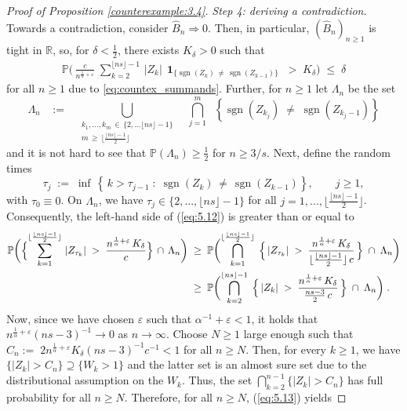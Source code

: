 \documentclass[11pt]{article}
\theoremstyle{definition}\newtheorem{example}[theorem]{Example}
\theoremstyle{definition}\newtheorem{counterexample}[theorem]{Counterexample}
\theoremstyle{definition}\newtheorem{remark}[theorem]{Remark}
\theoremstyle{definition}\newtheorem{defi}[theorem]{Definition}
\numberwithin{equation}{section}
\newcommand{\R}{\mathbb{R}}
\newcommand{\Pro}{\mathbb{P}}										%
\newcommand{\ind}{\operatorname{\mathbf{1}}}							%
\newcommand{\union}[2]{\overset{#2}{\bigcup\limits_{#1}}\;}					%
\newcommand{\intersection}[2]{\overset{#2}{\bigcap\limits_{#1}}\;}				%
\renewcommand{\|}{\; : \, \;}											%
\begin{document}
\begin{proof}[Proof of Proposition \ref{counterexample:3.4}]
	\phantom{ee} \emph{Step 4: deriving a contradiction}.
	Towards a contradiction, consider $\hat{B}_n \Rightarrow 0$. Then, in particular, $(\hat{B}_n)_{n\ge 1}$ is tight in $\R$, so, for $\delta< \frac{1}{2}$, there exists $K_\delta>0$ such that 
	\begin{align} \Pro \biggl( \, \frac{c}{n^{\frac 1 \alpha+\varepsilon}}\;  \sum_{k=2}^{\lfloor n s\rfloor  -1} \, |Z_k| \, \ind_{\{\operatorname{sgn}(Z_k)\, \neq \, \operatorname{sgn}(Z_{k-1})\}} \; > \; K_\delta \biggr) \; \le \; \delta \label{eq:5.12}
	\end{align}
	for all $n\ge 1$ due to \eqref{eq:countex_summands}. Further, for $n\ge 1$ let $\Lambda_n$ be the set
	$$ \Lambda_n \; \; \; := \;\; \; \union{\substack{k_1,...,k_{m} \, \in \, \{2,...\lfloor n s\rfloor -1\}\\ m \, \ge \, \lfloor \frac{\lfloor n s\rfloor-1}{2}\rfloor }}{} \; \; \intersection{j=1}{m} \; \left\{ \operatorname{sgn}(Z_{k_j}) \; \neq \; \operatorname{sgn}(Z_{k_j-1}) \right\}$$
	and it is not hard to see that $\Pro(\Lambda_n)\ge \frac12$ for $n\ge 3/s$. Next, define the random times 
	$$\tau_j \; := \; \operatorname{inf}\, \left\{ \, k>\tau_{j-1} \; : \; \operatorname{sgn}(Z_{k}) \, \neq \, \operatorname{sgn}(Z_{k-1})\right\}, \qquad j\ge 1,$$
	with $\tau_0 \equiv 0$. On $\Lambda_n$, we have $\tau_j \in \{ 2,...,\lfloor n s\rfloor-1\}$ for all $j=1,..., \lfloor \frac{\lfloor n s\rfloor-1}{2} \rfloor$. Consequently, the left-hand side of (\ref{eq:5.12}) is greater than or equal to
	\begin{align}
	\Pro \biggl(  \Bigl\{ \sum_{k=1}^{\lfloor \frac{\lfloor n s\rfloor-1}{2} \rfloor } \, |Z_{\tau_k}|  \; > \; \frac{n^{\frac 1 \alpha+\varepsilon}\, K_\delta}{c}   \Bigr\}  \, \cap \,  \Lambda_n \biggr) \; &\ge \; \Pro  \biggl(   \intersection{k=1}{\lfloor \frac{\lfloor n s\rfloor-1}{2} \rfloor} \, \Bigl\{ \, |Z_{\tau_k}|  \; > \; \frac{n^{\frac 1 \alpha+\varepsilon}\, K_\delta}{\lfloor \frac{\lfloor n s\rfloor-1}{2} \rfloor \, c}  \, \Bigr\} \; \cap \; \Lambda_n  \biggr) \notag \\
		&\ge \; \Pro \biggl(  \intersection{k=2}{\lfloor n s\rfloor-1} \, \Bigl\{ \, |Z_{k}|  \; > \; \frac{n^{\frac 1 \alpha+\varepsilon}\, K_\delta}{\frac{n s-3}{2} \, c}  \, \Bigr\} \; \cap \; \Lambda_n  \biggr) \; . \label{eq:5.13}
	\end{align}
	Now, since we have chosen $\varepsilon$ such that $\alpha^{-1}+\varepsilon<1$, it holds that $n^{\frac1\alpha +\varepsilon}(ns-3)^{-1} \to 0$ as $n\to \infty$. Choose $N\ge 1$ large enough such that $C_n := \; 2n^{\frac 1 \alpha+\varepsilon} K_\delta (ns-3)^{-1}c^{-1} < 1$ for all $n\ge N$. Then, for every $k \ge 1$, we have $\{|Z_k| > C_n\} \supseteq \{ W_k > 1\}$ and the latter set is an almost sure set due to the distributional assumption on the $W_k$. Thus, the set $\bigcap_{k=2}^{n-1} \{ |Z_{k}| > C_n\}$ has full probability for all $n\ge N$. Therefore, for all $n\ge N$, (\ref{eq:5.13}) yields 

\end{proof}
\end{document}
